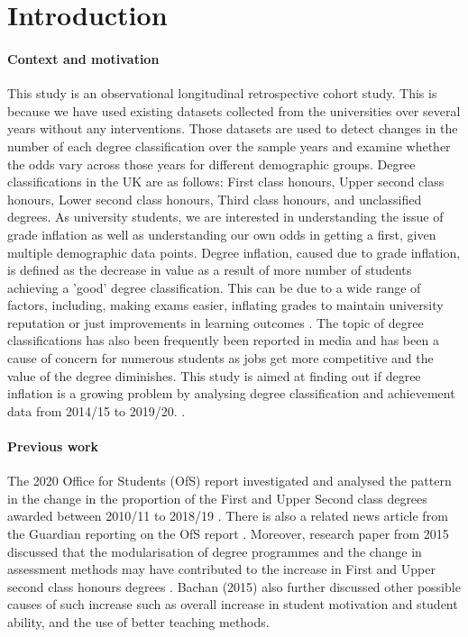 \documentclass[11pt,a4paper]{article}
\begin{document}
\section{Introduction}

\paragraph{Context and motivation}

This study is an observational longitudinal retrospective cohort study. This is because we have used existing datasets collected from the universities over several years without any interventions. Those datasets are used to detect changes in the number of each degree classification over the sample years and examine whether the odds vary across those years for different demographic groups.
Degree classifications in the UK are as follows: First class honours, Upper second class honours, Lower second class honours, Third class honours, and unclassified degrees.
As university students, we are interested in understanding the issue of grade inflation as well as understanding our own odds in getting a first, given multiple demographic data points. Degree inflation, caused due to grade inflation, is defined as the decrease in value as a result of more number of students achieving a 'good' degree classification. This can be due to a wide range of factors, including, making exams easier, inflating grades to maintain university reputation or just improvements in learning outcomes \cite{Bachan_2015}.
The topic of degree classifications has also been frequently been reported in media and has been a cause of concern for numerous students as jobs get more competitive and the value of the degree diminishes. This study is aimed at finding out if degree inflation is a growing problem by analysing degree classification and achievement data from 2014/15 to 2019/20. \cite{Weale_2020}\cite{Coughlan_2019}.
\paragraph{Previous work}
The 2020 Office for Students (OfS) report investigated and analysed the pattern in the change in the proportion of the First and Upper Second class degrees awarded between 2010/11 to 2018/19 \cite{OfS_2020}. There is also a related news article from the Guardian reporting on the OfS report \cite{Weale_2020}. Moreover, research paper from 2015 discussed that the modularisation of degree programmes and the change in assessment methods may have contributed to the increase in First and Upper second class honours degrees \cite{Bachan_2015}. Bachan (2015) also further discussed other possible causes of such increase such as overall increase in student motivation and student ability, and the use of better teaching methods.
\end{document}
